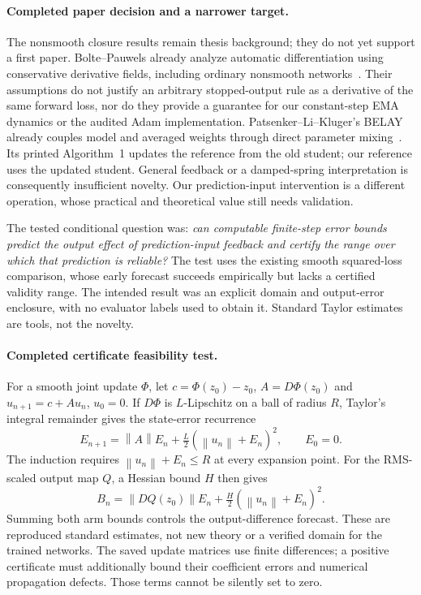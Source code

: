 \documentclass[11pt,a4paper]{article}
\newcommand{\norm}[1]{\left\lVert #1\right\rVert}
\begin{document}
\paragraph{Completed paper decision and a narrower target.}
The nonsmooth closure results remain thesis background; they do not yet
support a first paper. Bolte--Pauwels already analyze automatic
differentiation using conservative derivative fields, including ordinary
nonsmooth networks~\cite{boltepauwels}. Their assumptions do not justify
an arbitrary stopped-output rule as a derivative of the same forward loss,
nor do they provide a guarantee for our constant-step EMA dynamics or
the audited Adam implementation.
Patsenker--Li--Kluger's BELAY already couples model and averaged weights
through direct parameter mixing~\cite{belay}. Its printed Algorithm~1
updates the reference from the old student; our reference uses the updated
student. General feedback or a damped-spring interpretation is consequently
insufficient novelty. Our prediction-input intervention is a different
operation, whose practical and theoretical value still needs validation.

The tested conditional question was: \emph{can computable finite-step
error bounds predict the output effect of prediction-input feedback and
certify the range over which that prediction is reliable?} The test uses the
existing smooth squared-loss comparison, whose early forecast succeeds
empirically but lacks a certified validity range. The intended result was
an explicit domain and output-error enclosure, with no evaluator labels
used to obtain it. Standard Taylor estimates are tools, not the novelty.

\paragraph{Completed certificate feasibility test.}
For a smooth joint update $\Phi$, let $c=\Phi(z_0)-z_0$,
$A=D\Phi(z_0)$ and $u_{n+1}=c+Au_n$, $u_0=0$.
If $D\Phi$ is $L$-Lipschitz on a ball of radius $R$, Taylor's
integral remainder gives the state-error recurrence
\[
 E_{n+1}=\norm{A}E_n+\tfrac L2(\norm{u_n}+E_n)^2,
 \qquad E_0=0.
\]
The induction requires $\norm{u_n}+E_n\le R$ at every expansion point.
For the RMS-scaled output map $Q$, a Hessian bound $H$ then gives
\[
 B_n=\norm{DQ(z_0)}E_n+\tfrac H2(\norm{u_n}+E_n)^2.
\]
Summing both arm bounds controls the output-difference forecast. These
are reproduced standard estimates, not new theory or a verified domain
for the trained networks. The saved update matrices use finite differences;
a positive certificate must additionally bound their coefficient errors
and numerical propagation defects. Those terms cannot be silently set to zero.
\end{document}
